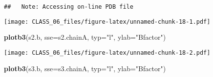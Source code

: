 \documentclass[
]{article}
\newenvironment{Shaded}{\begin{snugshade}}{\end{snugshade}}
\newcommand{\DataTypeTok}[1]{\textcolor[rgb]{0.13,0.29,0.53}{#1}}
\newcommand{\KeywordTok}[1]{\textcolor[rgb]{0.13,0.29,0.53}{\textbf{#1}}}
\newcommand{\NormalTok}[1]{#1}
\newcommand{\OperatorTok}[1]{\textcolor[rgb]{0.81,0.36,0.00}{\textbf{#1}}}
\newcommand{\StringTok}[1]{\textcolor[rgb]{0.31,0.60,0.02}{#1}}
\begin{document}
\begin{verbatim}
##   Note: Accessing on-line PDB file
\end{verbatim}

\begin{Shaded}
\end{Shaded}

\texttt{[image: CLASS\_06\_files/figure-latex/unnamed-chunk-18-1.pdf]}

\begin{Shaded}
\begin{Highlighting}[]
\KeywordTok{plotb3}\NormalTok{(s2.b, }\DataTypeTok{sse=}\NormalTok{s2.chainA, }\DataTypeTok{typ=}\StringTok{"l"}\NormalTok{, }\DataTypeTok{ylab=}\StringTok{"Bfactor"}\NormalTok{)}
\end{Highlighting}
\end{Shaded}

\texttt{[image: CLASS\_06\_files/figure-latex/unnamed-chunk-18-2.pdf]}

\begin{Shaded}
\begin{Highlighting}[]
\KeywordTok{plotb3}\NormalTok{(s3.b, }\DataTypeTok{sse=}\NormalTok{s3.chainA, }\DataTypeTok{typ=}\StringTok{"l"}\NormalTok{, }\DataTypeTok{ylab=}\StringTok{"Bfactor"}\NormalTok{)}
\end{Highlighting}
\end{Shaded}
\end{document}
